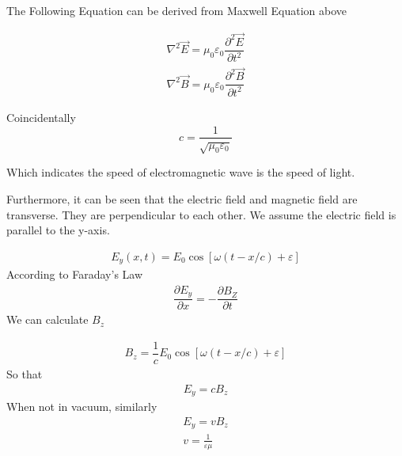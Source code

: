 The Following Equation can be derived from Maxwell Equation above

\begin{equation*}
  \begin{aligned}
    \nabla^{2} \vec{E} = \mu_{0} \varepsilon_{0} \dfrac{\partial^{2} \vec{E}}{\partial t^{2}}\\
    \nabla^{2} \vec{B} = \mu_{0} \varepsilon_{0} \dfrac{\partial^{2} \vec{B}}{\partial t^{2}} 
  \end{aligned}
\end{equation*}

Coincidentally
\begin{equation*}
  c = \dfrac{1}{\sqrt{\mu_{0} \varepsilon_{0}}} 
\end{equation*}

Which indicates the speed of electromagnetic wave is the speed of light.

Furthermore, it can be seen that the electric field and magnetic field are transverse. They are perpendicular to each other. We assume the electric field is parallel to the y-axis.

\begin{equation*}
  \begin{aligned}
    E_{y} (x,t) = E_{0} \cos \left[ \omega \left( t - x/c  \right) + \varepsilon \right]
  \end{aligned}
\end{equation*}
According to Faraday's Law
\begin{equation*}
  \begin{aligned}
    \dfrac{\partial E_{y}}{\partial x} = - \dfrac{\partial B_{Z}}{\partial t}  
  \end{aligned}
\end{equation*}
We can calculate $B_{z}$

\begin{equation*}
  \begin{aligned}
    B_z = \dfrac{1}{c} E_{0} \cos \left[ \omega \left( t - x/c  \right) + \varepsilon \right]
  \end{aligned}
\end{equation*}
So that
\begin{equation*}
  \begin{aligned}
    E_y = c B_z
  \end{aligned}
\end{equation*}
When not in vacuum, similarly
\begin{equation*}
  \begin{aligned}
    E_y=vB_z \\
    v=\frac{1}{\varepsilon\mu}
  \end{aligned}
\end{equation*}

